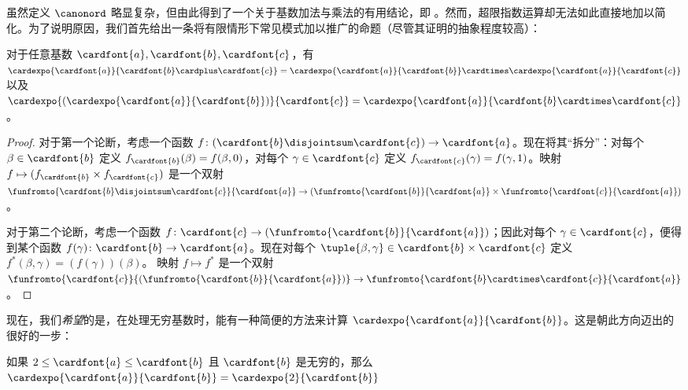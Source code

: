 \documentclass[../../../include/open-logic-section]{subfiles}
\begin{document}


虽然定义 $\canonord$ 略显复杂，但由此得到了一个关于基数加法与乘法的有用结论，即 。然而，超限指数运算却无法如此直接地加以简化。为了说明原因，我们首先给出一条将有限情形下常见模式加以推广的命题（尽管其证明的抽象程度较高）：

\begin{prop}
对于任意基数 $\cardfont{a}, \cardfont{b}, \cardfont{c}$，有 $\cardexpo{\cardfont{a}}{\cardfont{b} \cardplus \cardfont{c}} =
\cardexpo{\cardfont{a}}{\cardfont{b}} \cardtimes
\cardexpo{\cardfont{a}}{\cardfont{c}}$ 以及
$\cardexpo{(\cardexpo{\cardfont{a}}{\cardfont{b}})}{\cardfont{c}} =
\cardexpo{\cardfont{a}}{\cardfont{b} \cardtimes \cardfont{c}}$。
\end{prop}

\begin{proof}
对于第一个论断，考虑一个函数 $f \colon
(\cardfont{b}\disjointsum\cardfont{c}) \to \cardfont{a}$。现在将其“拆分”：对每个 $\beta \in \cardfont{b}$ 定义 $f_{\cardfont{b}}(\beta) = f(\beta, 0)$，对每个 $\gamma \in \cardfont{c}$ 定义 $f_{\cardfont{c}}(\gamma) = f(\gamma, 1)$。映射 $f \mapsto
(f_{\cardfont{b}} \times f_{\cardfont{c}})$ 是一个双射 $\funfromto{\cardfont{b} \disjointsum \cardfont{c}}{\cardfont{a}} \to
(\funfromto{\cardfont{b}}{\cardfont{a}} \times
\funfromto{\cardfont{c}}{\cardfont{a}})$。

对于第二个论断，考虑一个函数 $f \colon \cardfont{c} \to
(\funfromto{\cardfont{b}}{\cardfont{a}})$；因此对每个 $\gamma \in \cardfont{c}$，便得到某个函数 $f(\gamma) \colon \cardfont{b} \to
\cardfont{a}$。现在对每个 $\tuple{\beta, \gamma} \in \cardfont{b} \times \cardfont{c}$ 定义 $f^*(\beta, \gamma) = (f(\gamma))(\beta)$。
映射 $f \mapsto f^*$ 是一个双射 $\funfromto{\cardfont{c}}{(\funfromto{\cardfont{b}}{\cardfont{a}})}
\to \funfromto{\cardfont{b} \cardtimes \cardfont{c}}{\cardfont{a}}$。
\end{proof}

现在，我们\emph{希望}的是，在处理无穷基数时，能有一种简便的方法来计算 $\cardexpo{\cardfont{a}}{\cardfont{b}}$。这是朝此方向迈出的很好的一步：

\begin{prop}
如果 $2 \leq \cardfont{a} \leq \cardfont{b}$ 且 $\cardfont{b}$ 是无穷的，那么 $\cardexpo{\cardfont{a}}{\cardfont{b}} =
\cardexpo{2}{\cardfont{b}}$
\end{prop}
\end{document}
